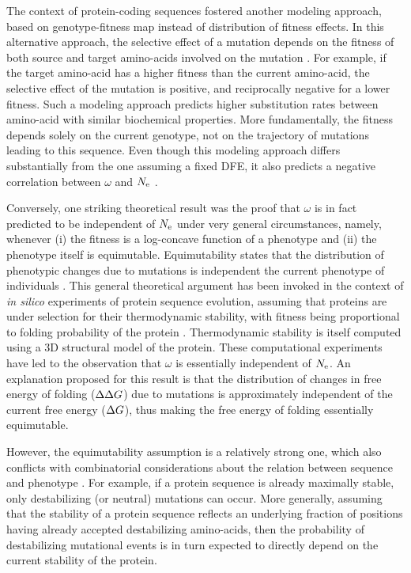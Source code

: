 The context of protein-coding sequences fostered another modeling approach, based on genotype-fitness map instead of distribution of fitness effects.
In this alternative approach, the selective effect of a mutation depends on the fitness of both source and target amino-acids involved on the mutation \citep{Halpern1998, Rodrigue2010, Tamuri2012}.
For example, if the target amino-acid has a higher fitness than the current amino-acid, the selective effect of the mutation is positive, and reciprocally negative for a lower fitness.
Such a modeling approach predicts higher substitution rates between amino-acid with similar biochemical properties.
More fundamentally, the fitness depends solely on the current genotype, not on the trajectory of mutations leading to this sequence.
Even though this modeling approach differs substantially from the one assuming a fixed DFE, it also predicts a negative correlation between $\omega$ and $N_{\mathrm{e}}$ \citep{Spielman2015, DosReis2015}.

Conversely, one striking theoretical result was the proof that $\omega$ is in fact predicted to be independent of $N_{\mathrm{e}}$ under very general circumstances, namely, whenever (i) the fitness is a log-concave function of a phenotype and (ii) the phenotype itself is equimutable.
Equimutability states that the distribution of phenotypic changes due to mutations is independent the current phenotype of individuals \citep{Cherry1998}.
This general theoretical argument has been invoked in the context of \textit{in silico} experiments of protein sequence evolution, assuming that proteins are under selection for their thermodynamic stability, with fitness being proportional to  folding probability of the protein \citep{Goldstein2013}.
Thermodynamic stability is itself computed using a 3D structural model of the protein. These computational experiments have led to the observation that $\omega$ is essentially independent of $N_{\mathrm{e}}$.
An explanation proposed for this result is that the distribution of changes in free energy of folding ($\Delta \Delta G$) due to mutations is approximately independent of the current free energy ($\Delta G$), thus making the free energy of folding essentially equimutable.

However, the equimutability assumption is a relatively strong one, which also conflicts with combinatorial considerations about the relation between sequence and phenotype \citep{Serohijos2012}.
For example, if a protein sequence is already maximally stable, only destabilizing (or neutral) mutations can occur.
More generally, assuming that the stability of a protein sequence reflects an underlying fraction of positions having already accepted destabilizing amino-acids, then the probability of destabilizing mutational events is in turn expected to directly depend on the current stability of the protein.

